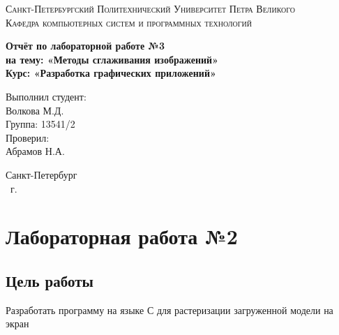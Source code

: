 \documentclass[14pt,a4paper,report]{report}
\begin{document}
\def\contentsname{Содержание}

\begin{titlepage}
\begin{center}
\textsc{Санкт-Петербургский Политехнический 
Университет Петра Великого\\[5mm]
Кафедра компьютерных систем и программных технологий}

\vfill

\textbf{Отчёт по лабораторной работе №3\\[3mm]
на тему: «Методы сглаживания изображений»\\[3mm]
Курс: «Разработка графических приложений»\\[41mm]
}
\end{center}

\hfill
\begin{minipage}{.4\textwidth}
Выполнил студент:\\[2mm] 
Волкова М.Д.\\
Группа: 13541/2\\[5mm]

Проверил:\\[2mm] 
Абрамов Н.А.
\end{minipage}
\vfill
\begin{center}
Санкт-Петербург\\ \the\year\ г.
\end{center}
\end{titlepage}

\tableofcontents
\clearpage

\chapter{Лабораторная работа №2}

\section{Цель работы}
Разработать программу на языке С для растеризации загруженной модели на экран
\end{document}
